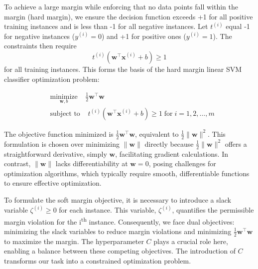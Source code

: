 \documentclass[12pt,letter]{article}
\begin{document}
To achieve a large margin while enforcing that no data points fall within the margin (hard margin), we ensure the decision function exceeds +1 for all positive training instances and is less than -1 for all negative instances. Let $t^{(i)}$ equal -1 for negative instances ($y^{(i)} = 0$) and +1 for positive ones ($y^{(i)} = 1$). The constraints then require
\begin{equation}
t^{(i)}(\textbf{w}^{\top} \textbf{x}^{(i)} + b) \geq 1
\end{equation}
for all training instances. This forms the basis of the hard margin linear SVM classifier optimization problem:

\begin{equation}
\begin{split}
    & \underset{\textbf{w}, b}{\text{minimize}} \;\;\;\; \frac{1}{2}\textbf{w}^{\top}\textbf{w} \\
    & \text{subject to} \;\;\;\; t^{(i)}(\textbf{w}^{\top}\textbf{x}^{(i)} + b) \ge 1 \; \text{for} \; i = 1, 2, \ldots, m
\end{split}
\end{equation}


\begin{mdframed}[middlelinewidth=0.5mm]
\begin{center}
\end{center}
The objective function minimized is $\frac{1}{2}\textbf{w}^{\top}\textbf{w}$, equivalent to $\frac{1}{2}\|\textbf{w}\|^2$. This formulation is chosen over minimizing $\|\textbf{w}\|$ directly because $\frac{1}{2}\|\textbf{w}\|^2$ offers a straightforward derivative, simply $\textbf{w}$, facilitating gradient calculations. In contrast, $\|\textbf{w}\|$ lacks differentiability at $\textbf{w} = 0$, posing challenges for optimization algorithms, which typically require smooth, differentiable functions to ensure effective optimization.
\end{mdframed}

To formulate the soft margin objective, it is necessary to introduce a slack variable $\zeta^{(i)} \geq 0$ for each instance. This variable, $\zeta^{(i)}$, quantifies the permissible margin violation for the i\textsuperscript{th} instance. Consequently, we face dual objectives: minimizing the slack variables to reduce margin violations and minimizing $\frac{1}{2}\textbf{w}^{\top}\textbf{w}$ to maximize the margin. The hyperparameter $C$ plays a crucial role here, enabling a balance between these competing objectives. The introduction of $C$ transforms our task into a constrained optimization problem.
\end{document}
